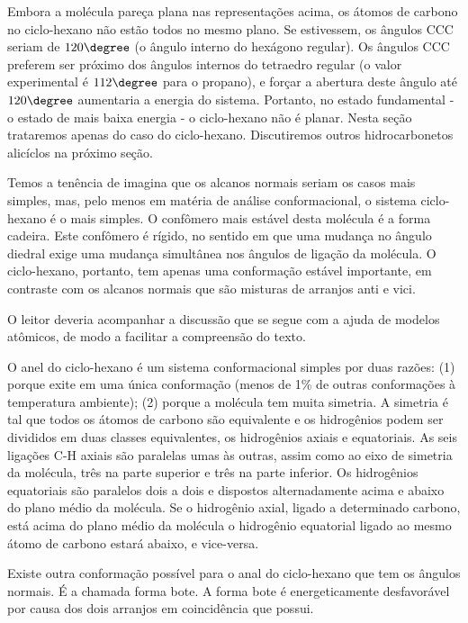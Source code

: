 \noindent Embora a molécula pareça plana nas representações acima, os átomos de carbono no ciclo-hexano não estão todos no mesmo plano. Se estivessem, os ângulos CCC seriam de $120\degree$ (o ângulo interno do hexágono regular). Os ângulos CCC preferem ser próximo dos ângulos internos do tetraedro regular (o valor experimental é $112\degree$ para o propano), e forçar a abertura deste ângulo até $120\degree$ aumentaria a energia do sistema. Portanto, no estado fundamental - o estado de mais baixa energia - o ciclo-hexano não é planar. Nesta seção trataremos apenas do caso do ciclo-hexano. Discutiremos outros hidrocarbonetos alicíclos na próximo seção.

Temos a tenência de imagina que os alcanos normais seriam os casos mais simples, mas, pelo menos em matéria de análise conformacional, o sistema ciclo-hexano é o mais simples. O confômero mais estável desta molécula é a forma cadeira. Este confômero é rígido, no sentido em que uma mudança no ângulo diedral exige uma mudança simultânea nos ângulos de ligação da molécula. O ciclo-hexano, portanto, tem apenas uma conformação estável importante, em contraste com os alcanos normais que são misturas de arranjos anti e vici.

O leitor deveria acompanhar a discussão que se segue com a ajuda de modelos atômicos, de modo a facilitar a compreensão do texto.

O anel do ciclo-hexano é um sistema conformacional simples por duas razões: (1) porque exite em uma única conformação (menos de 1\% de outras conformações à temperatura ambiente); (2) porque a molécula tem muita simetria. A simetria é tal que todos os átomos de carbono são equivalente e os hidrogênios podem ser divididos em duas classes equivalentes, os hidrogênios axiais e equatoriais. As seis ligações C-H axiais são paralelas umas às outras, assim como ao eixo de simetria da molécula, três na parte superior e três na parte inferior. Os hidrogênios equatoriais são paralelos dois a dois e dispostos alternadamente acima e abaixo do plano médio da molécula. Se o hidrogênio axial, ligado a determinado carbono, está acima do plano médio da molécula o hidrogênio equatorial ligado ao mesmo átomo de carbono estará abaixo, e vice-versa.

Existe outra conformação possível para o anal do ciclo-hexano que tem os ângulos normais. É a chamada forma bote. A forma bote é energeticamente desfavorável por causa dos dois arranjos em coincidência que possui.

